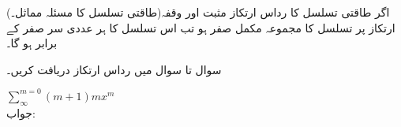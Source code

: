  (طاقتی تسلسل کا مسئلہ  مماثل۔)\quad اگر طاقتی تسلسل کا رداس ارتکاز مثبت اور وقفہ ارتکاز پر تسلسل کا مجموعہ مکمل صفر ہو تب اس تسلسل کا ہر عددی سر صفر کے برابر ہو گا۔

سوال  تا سوال  میں رداس ارتکاز دریافت کریں۔

\quad
$\sum\limits_{\infty}^{m=0} (m+1)mx^m$\\
جواب:
